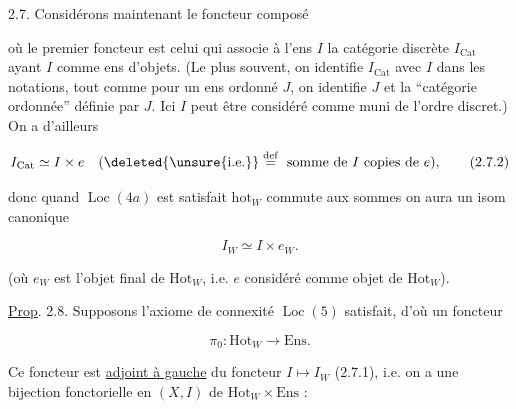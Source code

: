 
2.7.  Considérons maintenant le foncteur composé


où le premier foncteur est celui qui associe à l'ens $I$ la catégorie discrète $I_{\mathrm{Cat}}$ ayant $I$ comme ens d'objets. (Le plus souvent, on identifie $I_{\mathrm{Cat}}$ avec $I$ dans les notations, tout comme pour un ens ordonné $J$, on identifie $J$ et la ``catégorie ordonnée'' définie par $J$. Ici $I$ peut être considéré comme muni de l'ordre discret.) On a d'ailleurs

\[
 I_{\mathrm{Cat}}\simeq I\times e\quad (\deleted{\unsure{\mathrm{i.e.}}}\overset{\mathrm{def}}{=}\text{ somme de }I\text{ copies de }e),
 \tag*{(2.7.2)}
\]

donc quand  $\operatorname{Loc}(4a)$ est satisfait  $\mathrm{hot}_W$ commute aux sommes  on aura un isom canonique

\[
 I_W\simeq I\times e_W. \tag*{(2.7.3.)}
\]

(où $e_W$ est l'objet final de $\mathrm{Hot}_W$, i.e. $e$ considéré comme objet de $\mathrm{Hot}_W$).

\uline{Prop}. 2.8. Supposons  l'axiome  de connexité $\operatorname{Loc}(5)$ satisfait, d'où un foncteur

\[
 \pi_0:\mathrm{Hot}_W\longrightarrow\mathrm{Ens}. \tag*{(2.8.1)}
\]

Ce foncteur est \uline{adjoint à gauche} du foncteur $I\mapsto I_W$ (2.7.1), i.e. on a une bijection fonctorielle en $(X,I)$ de $\mathrm{Hot}_W\times\mathrm{Ens}$ :


